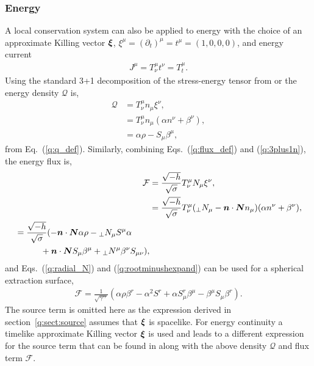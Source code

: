 \subsubsection{Energy} \label{q:sect:energy}
A local conservation system can also be applied to energy with the choice of an approximate Killing vector $\boldsymbol{\xi}$, $\xi^\mu = (\partial_t)^\mu = t^\mu =(1,0,0,0)$, and energy current
\begin{align}
\label{q:energycurrent} J^\mu = T^\mu_\nu t^\nu = T^\mu_t.
\end{align}
 Using the standard 3+1 decomposition of the stress-energy tensor from \cite{gourgoulhon20073+} or \cite{alcubierre2008introduction} the energy density $\mathcal{Q}$ is,
\begin{align}
\mathcal{Q} &= T^\mu_\nu n_\mu \xi^\nu, \\
            &= T^\mu_\nu n_\mu (\alpha n^\nu+ \beta^\nu), \\
            &= \alpha \rho - S_\mu \beta^\mu,
\end{align}
from Eq.~(\ref{q:q_def}). Similarly, combining Eqs.~(\ref{q:flux_def}) and (\ref{q:3plus1n}), the energy flux is,
\begin{align}\mathcal{F} &= \frac{\sqrt{-h}}{\sqrt{\sigma}}T^\mu_\nu N_\mu \xi^\nu, \\
            &= \frac{\sqrt{-h}}{\sqrt{\sigma}}T^\mu_\nu ({}_{\perp}N_\mu - \boldsymbol{n}\cdot \boldsymbol{N} n_\mu) (\alpha n^\nu + \beta^\nu), \\
    \begin{split} &= \frac{\sqrt{-h}}{\sqrt{\sigma}}(-\boldsymbol{n}\cdot \boldsymbol{N}\alpha\rho -  {}_{\perp}N_\mu S^\mu \alpha \\&\quad\quad\quad+ \boldsymbol{n}\cdot \boldsymbol{N} S_\mu \beta^\mu + {}_{\perp}N^\mu \beta^\nu S_{\mu\nu}), \end{split}
\end{align} 
and Eqs.~(\ref{q:radial_N}) and (\ref{q:rootminushexpand}) can be used for a spherical extraction surface,
\begin{align} 
 \mathcal{F} = \frac{1}{\sqrt{\gamma^{rr}}}(\alpha \rho \beta^r - \alpha^2 S^r   +  \alpha S^r_\mu\beta^\mu - \beta^\mu S_\mu \beta^r ). 
\end{align} 
 The source term is omitted here as the expression derived in section~\ref{q:sect:source} assumes that $\boldsymbol{\xi}$ is spacelike. For energy continuity a timelike approximate Killing vector $\boldsymbol{\xi}$ is used and leads to a different expression for the source term that can be found in \cite{Clough_2021} along with the above density $\mathcal{Q}$ and flux term $\mathcal{F}$. 
















